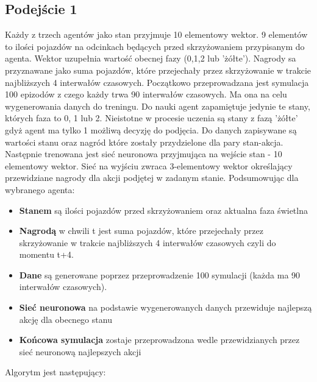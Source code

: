\documentclass[12pt]{book}
\theoremstyle{plain}
\begin{document}
	\subsection{Podejście 1}
	Każdy z trzech agentów jako stan przyjmuje 10 elementowy wektor. 9 elementów to ilości pojazdów na odcinkach będących przed skrzyżowaniem przypisanym do agenta. Wektor uzupełnia wartość obecnej fazy (0,1,2 lub 'żółte'). 
	Nagrody sa przyznawane jako suma pojazdów, które przejechały przez skrzyżowanie w trakcie najbliższych 4 interwałów czasowych. Początkowo przeprowadzana jest symulacja 100 epizodów z czego każdy trwa 90 interwałów czasowych. Ma ona na celu wygenerowania danych do treningu. Do nauki agent zapamiętuje jedynie te stany, których faza to 0, 1 lub 2. Nieistotne w procesie uczenia są stany z fazą 'żółte' gdyż agent ma tylko 1 możliwą decyzję do podjęcia. Do danych zapisywane są wartości stanu oraz nagród które zostały przydzielone dla pary stan-akcja. Następnie trenowana jest sieć neuronowa przyjmująca na wejście stan - 10 elementowy wektor. Sieć na wyjściu zwraca 3-elementowy wektor określający przewidziane nagrody dla akcji podjętej w zadanym stanie.
	Podsumowując dla wybranego agenta:
	\begin{itemize}
		\item \textbf{Stanem} są ilości pojazdów przed skrzyżowaniem oraz aktualna faza świetlna
		\item \textbf{Nagrodą} w chwili t jest suma pojazdów, które przejechały przez skrzyżowanie w trakcie najbliższych 4 interwałów czasowych czyli do momentu t+4.
		\item \textbf{Dane} są generowane poprzez przeprowadzenie 100 symulacji (każda ma 90 interwałów czasowych).
		\item \textbf{Sieć neuronowa} na podstawie wygenerowanych danych przewiduje najlepszą akcję dla obecnego stanu
		\item \textbf{Końcowa symulacja} zostaje przeprowadzona wedle przewidzianych przez sieć neuronową najlepszych akcji
	\end{itemize}
	
	
	Algorytm jest następujący:
	
\end{document}
